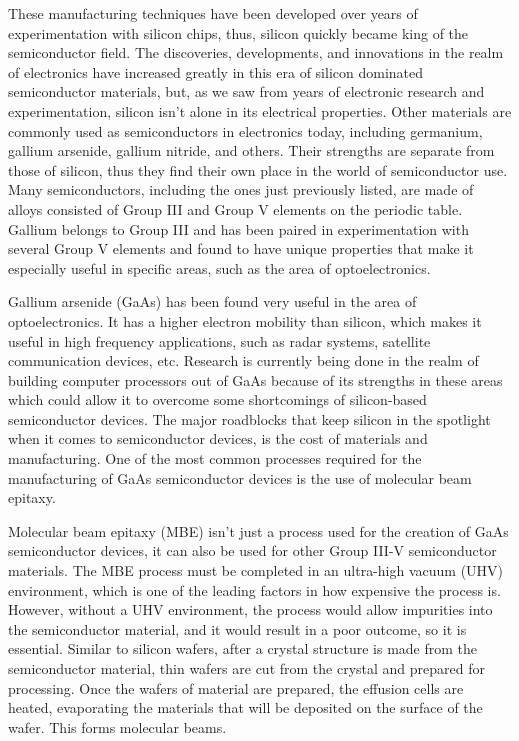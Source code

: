 \documentclass[12pt]{article}
\begin{document}
\begin{flushleft}
These manufacturing techniques have been developed
over years of experimentation with silicon chips, thus,
silicon quickly became king of the semiconductor field.
The discoveries, developments, and innovations in the
realm of electronics have increased greatly in this
era of silicon dominated semiconductor materials, but,
as we saw from years of electronic research and experimentation,
silicon isn't alone in its electrical properties. Other
materials are commonly used as semiconductors in electronics
today, including germanium, gallium arsenide, gallium
nitride, and others. Their strengths are separate from
those of silicon, thus they find their own place in
the world of semiconductor use.  Many semiconductors,
including the ones just previously listed, are made
of alloys consisted of Group III and Group V elements
on the periodic table. Gallium belongs to Group III
and has been paired in experimentation with several
Group V elements and found to have unique properties
that make it especially useful in specific areas, such
as the area of optoelectronics.

Gallium arsenide (GaAs) has been found very useful
in the area of optoelectronics. It has a higher electron
mobility than silicon, which makes it useful in high
frequency applications, such as radar systems, satellite
communication devices, etc. Research is currently being
done in the realm of building computer processors out
of GaAs because of its strengths in these areas which
could allow it to overcome some shortcomings of silicon-based
semiconductor devices. The major roadblocks that keep
silicon in the spotlight when it comes to semiconductor
devices, is the cost of materials and manufacturing.
One of the most common processes required for the manufacturing
of GaAs semiconductor devices is the use of molecular
beam epitaxy.

Molecular beam epitaxy (MBE) isn't just a process used
for the creation of GaAs semiconductor devices, it
can also be used for other Group III-V semiconductor
materials. The MBE process must be completed in an
ultra-high vacuum (UHV) environment, which is one of
the leading factors in how expensive the process is.
However, without a UHV environment, the process would
allow impurities into the semiconductor material, and
it would result in a poor outcome, so it is essential.
Similar to silicon wafers, after a crystal structure
is made from the semiconductor material, thin wafers
are cut from the crystal and prepared for processing.
Once the wafers of material are prepared, the effusion
cells are heated, evaporating the materials that will
be deposited on the surface of the wafer. This forms
molecular beams.





\newpage
\nocite{*}
\printbibliography

\end{flushleft}
\end{document}
